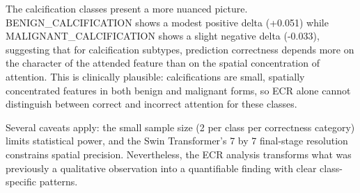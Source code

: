 \documentclass[justified,notoc,openany]{tufte-book}
\begin{document}
The calcification classes present a more nuanced picture. BENIGN\_CALCIFICATION shows a modest positive delta (+0.051) while MALIGNANT\_CALCIFICATION shows a slight negative delta (-0.033), suggesting that for calcification subtypes, prediction correctness depends more on the character of the attended feature than on the spatial concentration of attention. This is clinically plausible: calcifications are small, spatially concentrated features in both benign and malignant forms, so ECR alone cannot distinguish between correct and incorrect attention for these classes.

Several caveats apply: the small sample size (2 per class per correctness category) limits statistical power, and the Swin Transformer's 7 by 7 final-stage resolution constrains spatial precision. Nevertheless, the ECR analysis transforms what was previously a qualitative observation into a quantifiable finding with clear class-specific patterns.


\end{document}
